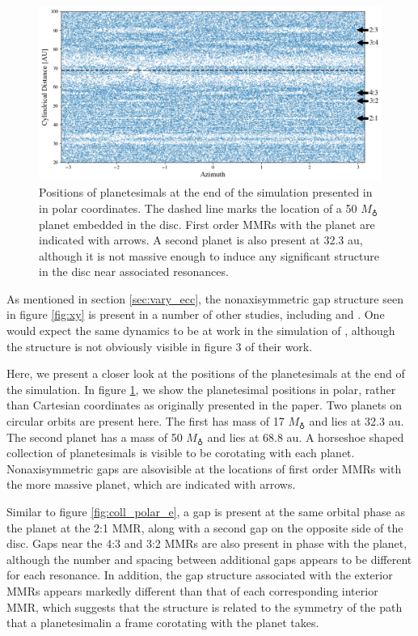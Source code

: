 \begin{figure}
    \includegraphics[width=\textwidth]{figures/grind/boley_rtheta.png}
    \caption{Positions of planetesimals at the end of the simulation presented in \cite{boley17} in polar coordinates. The dashed 
    line marks the location of a 50 $M_{\earth}$ planet embedded in the disc. First order MMRs with the planet are indicated with 
    arrows. A second planet is also present at 32.3 au, although it is not massive enough to induce any significant structure in the 
    disc near associated resonances.\label{fig:boley_rtheta}}
\end{figure}

As mentioned in section \ref{sec:vary_ecc}, the nonaxisymmetric gap structure seen in figure \ref{fig:xy} is present in a number 
of other studies, including \cite{richardson00} and \cite{tabeshian16}. One would expect the same dynamics to be at work in the 
simulation of \cite{boley17}, although the structure is not obviously visible in figure 3 of their work.

Here, we present a closer look at the positions of the planetesimals at the end of the \cite{boley17} simulation. In figure 
\ref{fig:boley_rtheta}, we show the planetesimal positions in polar, rather than Cartesian coordinates as originally presented in 
the paper. Two planets on circular orbits are present here. The first has mass of 17 $M_{\earth}$ and lies at 32.3 au. The second 
planet has a mass of 50 $M_{\earth}$ and lies at 68.8 au. A horseshoe shaped collection of planetesimals is visible to be 
corotating with each planet. Nonaxisymmetric gaps are alsovisible at the locations of first order MMRs with the more massive 
planet, which are indicated with arrows.

Similar to figure \ref{fig:coll_polar_e}, a gap is present at the same orbital phase as the planet at the 2:1 MMR, along with a 
second gap on the opposite side of the disc. Gaps near the 4:3 and 3:2 MMRs are also present in phase with the planet, 
although the number and spacing between additional gaps appears to be different for each resonance. In addition, the gap 
structure associated with the exterior MMRs appears markedly different than that of each corresponding interior MMR, which 
suggests that the structure is related to the symmetry of the path that a planetesimalin a frame corotating with the planet takes.